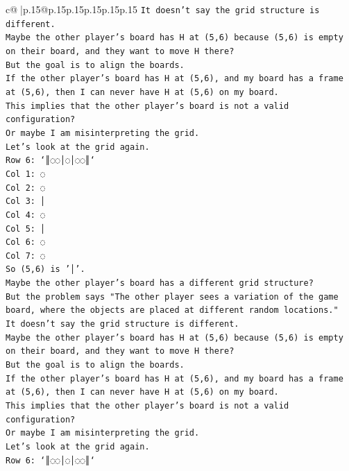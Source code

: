 \documentclass{article}
\begin{document}
{\begin{supertabular}{c@{$\;$}|p{.15\linewidth}@{}p{.15\linewidth}p{.15\linewidth}p{.15\linewidth}p{.15\linewidth}p{.15\linewidth}}
{{{\texttt{It doesn't say the grid structure is different.} \\
\texttt{Maybe the other player's board has H at (5,6) because (5,6) is empty on their board, and they want to move H there?} \\
\texttt{But the goal is to align the boards.} \\
\texttt{If the other player's board has H at (5,6), and my board has a frame at (5,6), then I can never have H at (5,6) on my board.} \\
\texttt{This implies that the other player's board is not a valid configuration?} \\
\texttt{Or maybe I am misinterpreting the grid.} \\
\texttt{Let's look at the grid again.} \\
\texttt{Row 6: `║◌◌│◌│◌◌║`} \\
\texttt{Col 1: ◌} \\
\texttt{Col 2: ◌} \\
\texttt{Col 3: │} \\
\texttt{Col 4: ◌} \\
\texttt{Col 5: │} \\
\texttt{Col 6: ◌} \\
\texttt{Col 7: ◌} \\
\texttt{So (5,6) is '│'.} \\
\texttt{Maybe the other player's board has a different grid structure?} \\
\texttt{But the problem says "The other player sees a variation of the game board, where the objects are placed at different random locations."} \\
\texttt{It doesn't say the grid structure is different.} \\
\texttt{Maybe the other player's board has H at (5,6) because (5,6) is empty on their board, and they want to move H there?} \\
\texttt{But the goal is to align the boards.} \\
\texttt{If the other player's board has H at (5,6), and my board has a frame at (5,6), then I can never have H at (5,6) on my board.} \\
\texttt{This implies that the other player's board is not a valid configuration?} \\
\texttt{Or maybe I am misinterpreting the grid.} \\
\texttt{Let's look at the grid again.} \\
\texttt{Row 6: `║◌◌│◌│◌◌║`} \\
}}}
\end{supertabular}}
\end{document}
